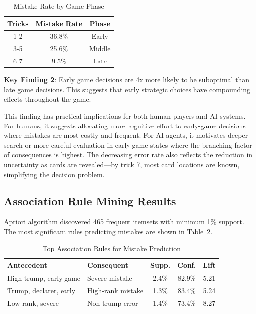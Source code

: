 \documentclass[conference]{IEEEtran}
\begin{document}
\begin{table}[htbp]
\caption{Mistake Rate by Game Phase}
\begin{center}
\begin{tabular}{ccc}
\toprule
\textbf{Tricks} & \textbf{Mistake Rate} & \textbf{Phase} \\
\midrule
1-2 & 36.8\% & Early \\
3-5 & 25.6\% & Middle \\
6-7 & 9.5\% & Late \\
\bottomrule
\end{tabular}
\label{tab:phase_mistakes}
\end{center}
\end{table}

\textbf{Key Finding 2}: Early game decisions are 4x more likely to be suboptimal than late game decisions. This suggests that early strategic choices have compounding effects throughout the game.

This finding has practical implications for both human players and AI systems. For humans, it suggests allocating more cognitive effort to early-game decisions where mistakes are most costly and frequent. For AI agents, it motivates deeper search or more careful evaluation in early game states where the branching factor of consequences is highest. The decreasing error rate also reflects the reduction in uncertainty as cards are revealed---by trick 7, most card locations are known, simplifying the decision problem.

\subsection{Association Rule Mining Results}

Apriori algorithm discovered 465 frequent itemsets with minimum 1\% support. The most significant rules predicting mistakes are shown in Table~\ref{tab:association_rules}.

\begin{table}[htbp]
\caption{Top Association Rules for Mistake Prediction}
\begin{center}
\begin{tabular}{p{2.5cm}p{2cm}ccc}
\toprule
\textbf{Antecedent} & \textbf{Consequent} & \textbf{Supp.} & \textbf{Conf.} & \textbf{Lift} \\
\midrule
High trump, early game & Severe mistake & 2.4\% & 82.9\% & 5.21 \\
Trump, declarer, early & High-rank mistake & 1.3\% & 83.4\% & 5.24 \\
Low rank, severe & Non-trump error & 1.4\% & 73.4\% & 8.27 \\
\bottomrule
\end{tabular}
\label{tab:association_rules}
\end{center}
\end{table}
\end{document}

